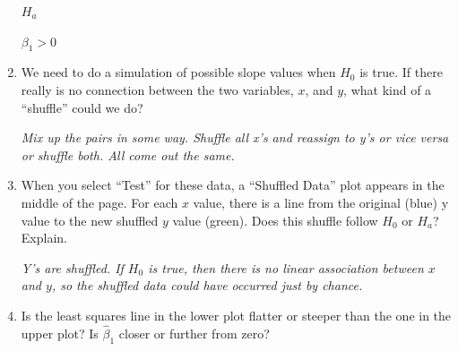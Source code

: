 \begin{enumerate}
  $H_a$
\begin{students}
 \vspace{1cm}      
\end{students}
\begin{key}
  {\it  $\beta_1 > 0$   }
\end{key}

\item We need to do a simulation of possible slope values when $H_0$
  is true. If there really is no connection between the two variables,
  $x$, and $y$, what kind of a ``shuffle'' could we do? 
\begin{students}
 \vspace{1cm}      
\end{students}

\begin{key}
  {\it Mix up the pairs in some way. Shuffle all x's and reassign to
    y's or vice versa or shuffle both.  All come out the same.}
\end{key}

\item When you select ``Test'' for these data, a ``Shuffled Data''
  plot appears in the middle of the page. For each $x$ value, there is
  a line from the original (blue) y value to the new shuffled $y$
  value (green).   Does this shuffle follow $H_0$ or $H_a$?  Explain.
\begin{students}
 \vspace{1cm}      
\end{students}

\begin{key}
  {\it  Y's are shuffled. If $H_0$
  is true, then there is no linear association between $x$ and $y$, so
the shuffled data could have occurred just by chance.}
\end{key}


\item %
Is the least squares line in the lower plot  flatter or steeper than
the one  in the upper plot?  Is $\hat{\beta}_1$ closer or further
from zero? 
\begin{students}
 \vspace{1cm}      
\end{students}


\end{enumerate}
